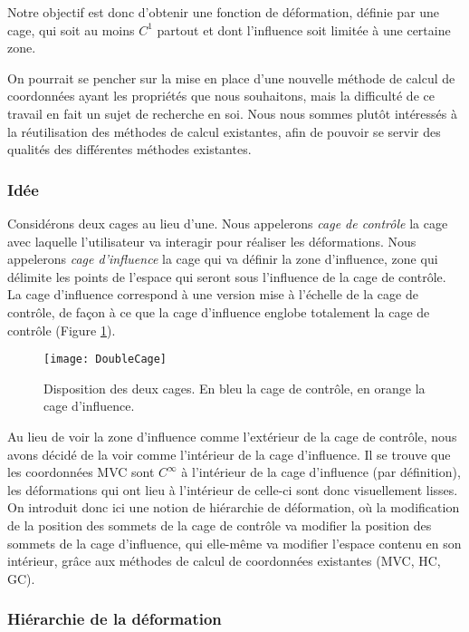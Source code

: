 Notre objectif est donc d'obtenir une fonction de déformation, définie par une
cage, qui soit au moins $C^1$ partout et dont l'influence soit limitée à une
certaine zone.

On pourrait se pencher sur la mise en place d'une nouvelle méthode de calcul
de coordonnées ayant les propriétés que nous souhaitons, mais la difficulté de
ce travail en fait un sujet de recherche en soi. Nous nous sommes plutôt
intéressés à la réutilisation des méthodes de calcul existantes, afin de
pouvoir se servir des qualités des différentes méthodes existantes.

\subsubsection{Idée}

Considérons deux cages au lieu d'une. Nous appelerons \textit{cage de
contrôle} la cage avec laquelle l'utilisateur va interagir pour réaliser les
déformations. Nous appelerons \textit{cage d'influence} la cage qui va définir
la zone d'influence, zone qui délimite les points de l'espace qui seront sous
l'influence de la cage de contrôle. La cage d'influence correspond à une
version mise à l'échelle de la cage de contrôle, de façon à ce que la cage
d'influence englobe totalement la cage de contrôle (Figure \ref{MELDou}).

\begin{figure}[ht]
  \begin{center}
    \texttt{[image: DoubleCage]}
    \caption{Disposition des deux cages. En bleu la cage de contrôle, en orange
    la cage d'influence.}
    \label{MELDou}
  \end{center}
\end{figure}

Au lieu de voir la zone d'influence comme l'extérieur de la cage de contrôle,
nous avons décidé de la voir comme l'intérieur de la cage d'influence. Il se
trouve que les coordonnées MVC sont $C^{\infty}$ à l'intérieur de la cage
d'influence (par définition), les déformations qui ont lieu à l'intérieur de
celle-ci sont donc visuellement lisses. On introduit donc ici une notion de
hiérarchie de déformation, où la modification de la position des sommets de la
cage de contrôle va modifier la position des sommets de la cage d'influence,
qui elle-même va modifier l'espace contenu en son intérieur, grâce aux
méthodes de calcul de coordonnées existantes (MVC, HC, GC). \\

\subsubsection{Hiérarchie de la déformation}

